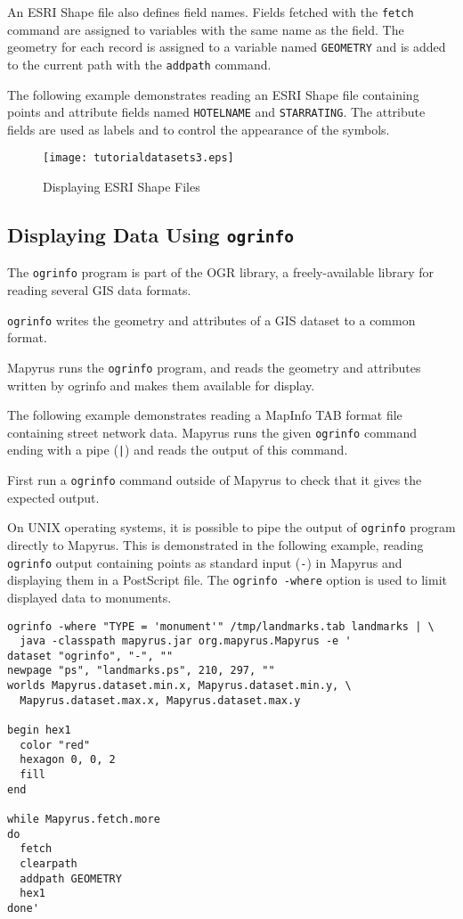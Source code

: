 An ESRI Shape file also defines field names.  Fields fetched with the
\texttt{fetch} command are assigned to variables with the same name as the
field.  The geometry for each record is assigned to a variable named
\texttt{GEOMETRY} and is added to the current path with the \texttt{addpath}
command.

The following example demonstrates reading an ESRI Shape file containing points
and attribute fields named \texttt{HOTELNAME} and \texttt{STARRATING}.  The
attribute fields are used as labels and to control the appearance of the
symbols.



\begin{figure}[htb]
\texttt{[image: tutorialdatasets3.eps]}
\caption{Displaying ESRI Shape Files}
\label{tutorialdatasets3}
\end{figure}

\subsection{Displaying Data Using \texttt{ogrinfo}}

The \texttt{ogrinfo} program is part of the OGR library, a freely-available
library for reading several GIS data formats.

\texttt{ogrinfo} writes the geometry and attributes of a GIS dataset
to a common format.

Mapyrus runs the \texttt{ogrinfo} program, and reads the
geometry and attributes written by ogrinfo and makes them available
for display.

The following example demonstrates reading a MapInfo TAB format
file containing street network data.  Mapyrus runs the
given \texttt{ogrinfo} command ending with a pipe (\texttt{|})
and reads the output of this command.



First run a \texttt{ogrinfo} command outside of Mapyrus
to check that it gives the expected output.

On UNIX operating systems, it is possible to pipe the output of
\texttt{ogrinfo} program directly to Mapyrus.  This is demonstrated in the
following example, reading \texttt{ogrinfo} output containing points as
standard input (\texttt{-})
in Mapyrus and displaying them in a PostScript file.
The \texttt{ogrinfo -where} option is used to limit displayed
data to monuments.

\begin{verbatim}
ogrinfo -where "TYPE = 'monument'" /tmp/landmarks.tab landmarks | \
  java -classpath mapyrus.jar org.mapyrus.Mapyrus -e '
dataset "ogrinfo", "-", ""
newpage "ps", "landmarks.ps", 210, 297, ""
worlds Mapyrus.dataset.min.x, Mapyrus.dataset.min.y, \
  Mapyrus.dataset.max.x, Mapyrus.dataset.max.y

begin hex1
  color "red"
  hexagon 0, 0, 2
  fill
end

while Mapyrus.fetch.more
do
  fetch
  clearpath
  addpath GEOMETRY
  hex1
done'
\end{verbatim}

